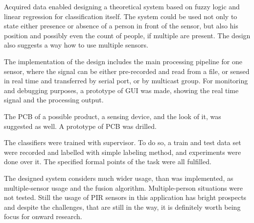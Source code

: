 Acquired data enabled designing a theoretical system based on fuzzy logic and linear regression for classification itself. The system
could be used not only to state either presence or absence of a person in front of the sensor, but also his position and possibly
even the count of people, if multiple are present. The design also suggests a way how to use multiple sensors.

The implementation of the design includes the main processing pipeline for one sensor, where the signal can be either pre-recorded
and read from a file, or sensed in real time and transferred by serial port, or by multicast group. For monitoring and debugging
purposes, a prototype of GUI was made, showing the real time signal and the processing output.

The PCB of a possible product, a sensing device, and the look of it, was suggested as well. A prototype of PCB was drilled.

The classifiers were trained with supervisor. To do so, a train and test data set were recorded and labelled with simple labeling method,
and experiments were done over it. The specified formal points of the task were all fulfilled.

The designed system considers much wider usage, than was implemented, as multiple-sensor usage and the fusion algorithm. Multiple-person
situations were not tested. Still the usage of PIR sensors in this application has bright prospects and despite the challenges, that
are still in the way, it is definitely worth being focus for onward research.






